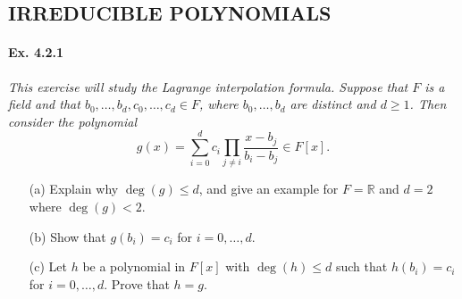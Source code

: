\documentclass[11pt,a4paper]{article}
\newcommand{\R}{\mathbb{R}}
\begin{document}
\subsection{IRREDUCIBLE POLYNOMIALS}
\paragraph{Ex. 4.2.1}

{\it This exercise will study the Lagrange interpolation formula. Suppose that $F$ is a field and that $b_0,\ldots,b_d,c_0,\ldots,c_d \in F$, where $b_0,\ldots,b_d$ are distinct and $d\geq 1$. Then consider the polynomial
$$g(x) = \sum_{i=0}^d c_i \prod_{j\ne i} \frac{x-b_j}{b_i-b_j} \in F[x].$$
\begin{enumerate}
\item[(a)] Explain why $\deg(g) \leq d$, and give an example for $F=\R$ and $d=2$ where $\deg(g)<2$.
\item[(b)] Show that $g(b_i) = c_i$ for $i=0,\ldots,d$.
\item[(c)] Let $h$ be a polynomial in $F[x]$ with $\deg(h) \leq d$ such that $h(b_i) = c_i$ for $i=0,\ldots,d$. Prove that $h=g$.
\end{enumerate}
}
\end{document}
